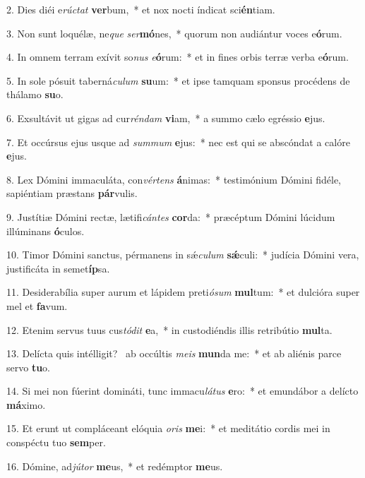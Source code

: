 2. Dies diéi e\textit{rúc}\textit{tat} \textbf{ver}bum,~*  et nox nocti índicat sci\textbf{én}tiam.\

3. Non sunt loquélæ, ne\textit{que} \textit{ser}\textbf{mó}nes,~*  quorum non audiántur voces e\textbf{ó}rum.\

4. In omnem terram exívit so\textit{nus} \textit{e}\textbf{ó}rum:~*  et in fines orbis terræ verba e\textbf{ó}rum.\

5. In sole pósuit taberná\textit{cu}\textit{lum} \textbf{su}um:~*  et ipse tamquam sponsus procédens de thálamo \textbf{su}o.\

6. Exsultávit ut gigas ad cur\textit{rén}\textit{dam} \textbf{vi}am,~*  a summo cælo egréssio \textbf{e}jus.\

7. Et occúrsus ejus usque ad \textit{sum}\textit{mum} \textbf{e}jus:~*  nec est qui se abscóndat a calóre \textbf{e}jus.\

8. Lex Dómini immaculáta, con\textit{vér}\textit{tens} \textbf{á}nimas:~*  testimónium Dómini fidéle, sapiéntiam præstans \textbf{pár}vulis.\

9. Justítiæ Dómini rectæ, lætifi\textit{cán}\textit{tes} \textbf{cor}da:~*  præcéptum Dómini lúcidum illúminans \textbf{ó}culos.\

10. Timor Dómini sanctus, pérmanens in sǽ\textit{cu}\textit{lum} \textbf{sǽ}culi:~*  judícia Dómini vera, justificáta in semet\textbf{íp}sa.\

11. Desiderabília super aurum et lápidem preti\textit{ó}\textit{sum} \textbf{mul}tum:~*  et dulcióra super mel et \textbf{fa}vum.\

12. Etenim servus tuus cus\textit{tó}\textit{dit} \textbf{e}a,~*  in custodiéndis illis retribútio \textbf{mul}ta.\

13. Delícta quis intélligit? \dag\  ab occúltis \textit{me}\textit{is} \textbf{mun}da me:~*  et ab aliénis parce servo \textbf{tu}o.\

14. Si mei non fúerint domináti, tunc immacu\textit{lá}\textit{tus} \textbf{e}ro:~*  et emundábor a delícto \textbf{má}ximo.\

15. Et erunt ut compláceant elóquia \textit{o}\textit{ris} \textbf{me}i:~*  et meditátio cordis mei in conspéctu tuo \textbf{sem}per.\

16. Dómine, ad\textit{jú}\textit{tor} \textbf{me}us,~*  et redémptor \textbf{me}us.\

